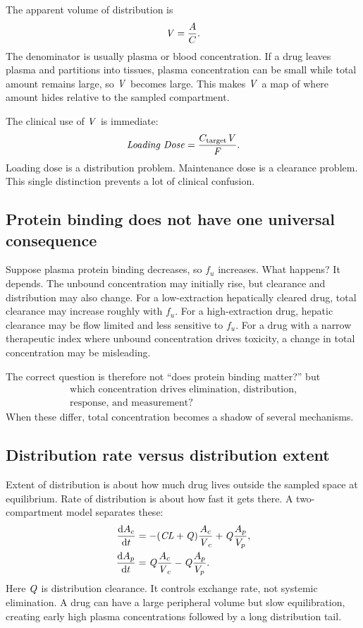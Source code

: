 \documentclass[a4paper]{article}
\newcommand{\pkCL}{\pksym{CL}}
\newcommand{\pkV}{\pksym{V}}
\newcommand{\pkVc}{\pksym{V}_{c}}
\newcommand{\pkF}{\pksym{F}}
\newcommand{\pkQ}{\pksym{Q}}
\begin{document}
The apparent volume of distribution is
\[
  \pkV=\frac{A}{C}.
\]
The denominator is usually plasma or blood concentration. If a drug leaves plasma and partitions into tissues, plasma concentration can be small while total amount remains large, so \(\pkV\) becomes large. This makes \(\pkV\) a map of where amount hides relative to the sampled compartment.

The clinical use of \(\pkV\) is immediate:
\[
  \pksym{Loading\ Dose}
  =
  \frac{C_{\pklab{target}}\pkV}{\pkF}.
\]
Loading dose is a distribution problem. Maintenance dose is a clearance problem. This single distinction prevents a lot of clinical confusion.

\subsection{Protein binding does not have one universal consequence}

Suppose plasma protein binding decreases, so \(f_u\) increases. What happens? It depends. The unbound concentration may initially rise, but clearance and distribution may also change. For a low-extraction hepatically cleared drug, total clearance may increase roughly with \(f_u\). For a high-extraction drug, hepatic clearance may be flow limited and less sensitive to \(f_u\). For a drug with a narrow therapeutic index where unbound concentration drives toxicity, a change in total concentration may be misleading.

The correct question is therefore not ``does protein binding matter?'' but
\[
  \begin{gathered}
  \text{which concentration drives elimination, distribution,}\\
  \text{response, and measurement?}
  \end{gathered}
\]
When these differ, total concentration becomes a shadow of several mechanisms.

\subsection{Distribution rate versus distribution extent}

Extent of distribution is about how much drug lives outside the sampled space at equilibrium. Rate of distribution is about how fast it gets there. A two-compartment model separates these:
\[
  \begin{aligned}
  \frac{\dd A_c}{\dd t}
  &=
  -(\pkCL+\pkQ)\frac{A_c}{\pkVc}
  +
  \pkQ\frac{A_p}{V_p},\\
  \frac{\dd A_p}{\dd t}
  &=
  \pkQ\frac{A_c}{\pkVc}
  -
  \pkQ\frac{A_p}{V_p}.
  \end{aligned}
\]
Here \(\pkQ\) is distribution clearance. It controls exchange rate, not systemic elimination. A drug can have a large peripheral volume but slow equilibration, creating early high plasma concentrations followed by a long distribution tail.
\end{document}
